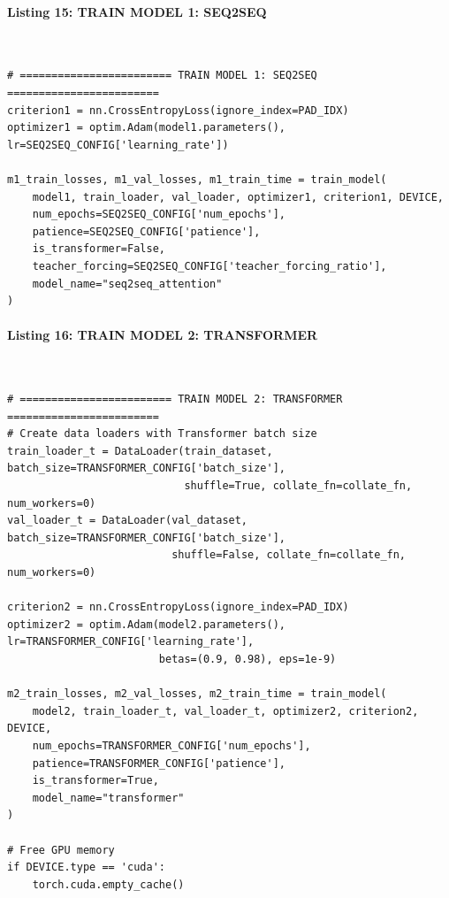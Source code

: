 \documentclass[12pt,a4paper,oneside]{report}
\begin{document}
\paragraph{Listing 15: TRAIN MODEL 1: SEQ2SEQ}\mbox{}\\[-1ex]
\begin{Verbatim}[commandchars=\\\{\},breaklines=true,breakanywhere=true,fontsize=\scriptsize,frame=leftline,framesep=2mm,rulecolor=\color{gray}]
# ======================== TRAIN MODEL 1: SEQ2SEQ ========================
criterion1 = nn.CrossEntropyLoss(ignore_index=PAD_IDX)
optimizer1 = optim.Adam(model1.parameters(), lr=SEQ2SEQ_CONFIG['learning_rate'])

m1_train_losses, m1_val_losses, m1_train_time = train_model(
    model1, train_loader, val_loader, optimizer1, criterion1, DEVICE,
    num_epochs=SEQ2SEQ_CONFIG['num_epochs'],
    patience=SEQ2SEQ_CONFIG['patience'],
    is_transformer=False,
    teacher_forcing=SEQ2SEQ_CONFIG['teacher_forcing_ratio'],
    model_name="seq2seq_attention"
)
\end{Verbatim}
\paragraph{Listing 16: TRAIN MODEL 2: TRANSFORMER}\mbox{}\\[-1ex]
\begin{Verbatim}[commandchars=\\\{\},breaklines=true,breakanywhere=true,fontsize=\scriptsize,frame=leftline,framesep=2mm,rulecolor=\color{gray}]
# ======================== TRAIN MODEL 2: TRANSFORMER ========================
# Create data loaders with Transformer batch size
train_loader_t = DataLoader(train_dataset, batch_size=TRANSFORMER_CONFIG['batch_size'],
                            shuffle=True, collate_fn=collate_fn, num_workers=0)
val_loader_t = DataLoader(val_dataset, batch_size=TRANSFORMER_CONFIG['batch_size'],
                          shuffle=False, collate_fn=collate_fn, num_workers=0)

criterion2 = nn.CrossEntropyLoss(ignore_index=PAD_IDX)
optimizer2 = optim.Adam(model2.parameters(), lr=TRANSFORMER_CONFIG['learning_rate'],
                        betas=(0.9, 0.98), eps=1e-9)

m2_train_losses, m2_val_losses, m2_train_time = train_model(
    model2, train_loader_t, val_loader_t, optimizer2, criterion2, DEVICE,
    num_epochs=TRANSFORMER_CONFIG['num_epochs'],
    patience=TRANSFORMER_CONFIG['patience'],
    is_transformer=True,
    model_name="transformer"
)

# Free GPU memory
if DEVICE.type == 'cuda':
    torch.cuda.empty_cache()
\end{Verbatim}
\end{document}
